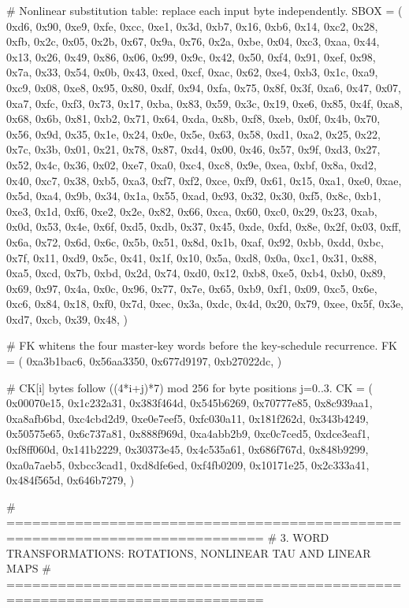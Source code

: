 \begin{lightcode}[numbers=left,firstnumber=1]
# Nonlinear substitution table: replace each input byte independently.
SBOX = (
    0xd6, 0x90, 0xe9, 0xfe, 0xcc, 0xe1, 0x3d, 0xb7, 0x16, 0xb6, 0x14, 0xc2, 0x28, 0xfb, 0x2c, 0x05,
    0x2b, 0x67, 0x9a, 0x76, 0x2a, 0xbe, 0x04, 0xc3, 0xaa, 0x44, 0x13, 0x26, 0x49, 0x86, 0x06, 0x99,
    0x9c, 0x42, 0x50, 0xf4, 0x91, 0xef, 0x98, 0x7a, 0x33, 0x54, 0x0b, 0x43, 0xed, 0xcf, 0xac, 0x62,
    0xe4, 0xb3, 0x1c, 0xa9, 0xc9, 0x08, 0xe8, 0x95, 0x80, 0xdf, 0x94, 0xfa, 0x75, 0x8f, 0x3f, 0xa6,
    0x47, 0x07, 0xa7, 0xfc, 0xf3, 0x73, 0x17, 0xba, 0x83, 0x59, 0x3c, 0x19, 0xe6, 0x85, 0x4f, 0xa8,
    0x68, 0x6b, 0x81, 0xb2, 0x71, 0x64, 0xda, 0x8b, 0xf8, 0xeb, 0x0f, 0x4b, 0x70, 0x56, 0x9d, 0x35,
    0x1e, 0x24, 0x0e, 0x5e, 0x63, 0x58, 0xd1, 0xa2, 0x25, 0x22, 0x7c, 0x3b, 0x01, 0x21, 0x78, 0x87,
    0xd4, 0x00, 0x46, 0x57, 0x9f, 0xd3, 0x27, 0x52, 0x4c, 0x36, 0x02, 0xe7, 0xa0, 0xc4, 0xc8, 0x9e,
    0xea, 0xbf, 0x8a, 0xd2, 0x40, 0xc7, 0x38, 0xb5, 0xa3, 0xf7, 0xf2, 0xce, 0xf9, 0x61, 0x15, 0xa1,
    0xe0, 0xae, 0x5d, 0xa4, 0x9b, 0x34, 0x1a, 0x55, 0xad, 0x93, 0x32, 0x30, 0xf5, 0x8c, 0xb1, 0xe3,
    0x1d, 0xf6, 0xe2, 0x2e, 0x82, 0x66, 0xca, 0x60, 0xc0, 0x29, 0x23, 0xab, 0x0d, 0x53, 0x4e, 0x6f,
    0xd5, 0xdb, 0x37, 0x45, 0xde, 0xfd, 0x8e, 0x2f, 0x03, 0xff, 0x6a, 0x72, 0x6d, 0x6c, 0x5b, 0x51,
    0x8d, 0x1b, 0xaf, 0x92, 0xbb, 0xdd, 0xbc, 0x7f, 0x11, 0xd9, 0x5c, 0x41, 0x1f, 0x10, 0x5a, 0xd8,
    0x0a, 0xc1, 0x31, 0x88, 0xa5, 0xcd, 0x7b, 0xbd, 0x2d, 0x74, 0xd0, 0x12, 0xb8, 0xe5, 0xb4, 0xb0,
    0x89, 0x69, 0x97, 0x4a, 0x0c, 0x96, 0x77, 0x7e, 0x65, 0xb9, 0xf1, 0x09, 0xc5, 0x6e, 0xc6, 0x84,
    0x18, 0xf0, 0x7d, 0xec, 0x3a, 0xdc, 0x4d, 0x20, 0x79, 0xee, 0x5f, 0x3e, 0xd7, 0xcb, 0x39, 0x48,
)

# FK whitens the four master-key words before the key-schedule recurrence.
FK = (
    0xa3b1bac6, 0x56aa3350,
    0x677d9197, 0xb27022dc,
)

# CK[i] bytes follow ((4*i+j)*7) mod 256 for byte positions j=0..3.
CK = (
    0x00070e15, 0x1c232a31, 0x383f464d, 0x545b6269,
    0x70777e85, 0x8c939aa1, 0xa8afb6bd, 0xc4cbd2d9,
    0xe0e7eef5, 0xfc030a11, 0x181f262d, 0x343b4249,
    0x50575e65, 0x6c737a81, 0x888f969d, 0xa4abb2b9,
    0xc0c7ced5, 0xdce3eaf1, 0xf8ff060d, 0x141b2229,
    0x30373e45, 0x4c535a61, 0x686f767d, 0x848b9299,
    0xa0a7aeb5, 0xbcc3cad1, 0xd8dfe6ed, 0xf4fb0209,
    0x10171e25, 0x2c333a41, 0x484f565d, 0x646b7279,
)

# ============================================================================
# 3. WORD TRANSFORMATIONS: ROTATIONS, NONLINEAR TAU AND LINEAR MAPS
# ============================================================================



\end{lightcode}
